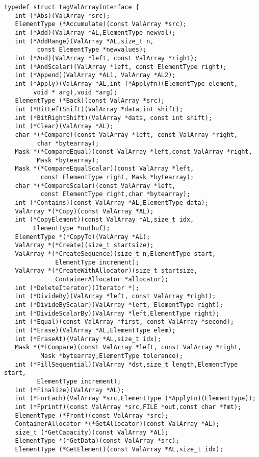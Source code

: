 \begin{verbatim}
typedef struct tagValArrayInterface {
   int (*Abs)(ValArray *src); 
   ElementType (*Accumulate)(const ValArray *src);
   int (*Add)(ValArray *AL,ElementType newval);
   int (*AddRange)(ValArray *AL,size_t n,
         const ElementType *newvalues);
   int (*And)(ValArray *left, const ValArray *right);
   int (*AndScalar)(ValArray *left, const ElementType right);
   int (*Append)(ValArray *AL1, ValArray *AL2);
   int (*Apply)(ValArray *AL,int (*Applyfn)(ElementType element,
        void * arg),void *arg);
   ElementType (*Back)(const ValArray *src);
   int (*BitLeftShift)(ValArray *data,int shift);
   int (*BitRightShift)(ValArray *data, const int shift);
   int (*Clear)(ValArray *AL);
   char *(*Compare)(const ValArray *left, const ValArray *right,
         char *bytearray);
   Mask *(*CompareEqual)(const ValArray *left,const ValArray *right,
         Mask *bytearray);
   Mask *(*CompareEqualScalar)(const ValArray *left,
          const ElementType right, Mask *bytearray);
   char *(*CompareScalar)(const ValArray *left,
          const ElementType right,char *bytearray);
   int (*Contains)(const ValArray *AL,ElementType data);
   ValArray *(*Copy)(const ValArray *AL);
   int (*CopyElement)(const ValArray *AL,size_t idx,
        ElementType *outbuf);
   ElementType *(*CopyTo)(ValArray *AL);
   ValArray *(*Create)(size_t startsize);
   ValArray *(*CreateSequence)(size_t n,ElementType start,
              ElementType increment);
   ValArray *(*CreateWithAllocator)(size_t startsize,
              ContainerAllocator *allocator);
   int (*DeleteIterator)(Iterator *);
   int (*DivideBy)(ValArray *left, const ValArray *right);
   int (*DivideByScalar)(ValArray *left, ElementType right);
   int (*DivideScalarBy)(ValArray *left,ElementType right);
   int (*Equal)(const ValArray *first, const ValArray *second);
   int (*Erase)(ValArray *AL,ElementType elem);
   int (*EraseAt)(ValArray *AL,size_t idx);
   Mask *(*FCompare)(const ValArray *left, const ValArray *right,
          Mask *bytearray,ElementType tolerance);
   int (*FillSequential)(ValArray *dst,size_t length,ElementType start,
         ElementType increment);
   int (*Finalize)(ValArray *AL);
   int (*ForEach)(ValArray *src,ElementType (*ApplyFn)(ElementType));
   int (*Fprintf)(const ValArray *src,FILE *out,const char *fmt);
   ElementType (*Front)(const ValArray *src);
   ContainerAllocator *(*GetAllocator)(const ValArray *AL);
   size_t (*GetCapacity)(const ValArray *AL);
   ElementType *(*GetData)(const ValArray *src);
   ElementType (*GetElement)(const ValArray *AL,size_t idx);

\end{verbatim}
